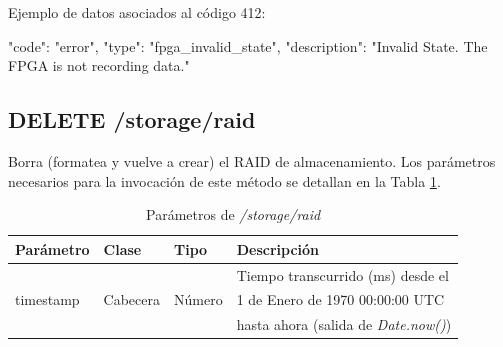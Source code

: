 \begin{itemize}
{\begin{minipage}{\textwidth}
Ejemplo de datos asociados al código 412:

\begin{code}[language=json]
{
  "code": "error",
  "type": "fpga_invalid_state",
  "description": "Invalid State. The FPGA is not recording data."
}
\end{code}
\end{minipage}
}

\end{itemize}

%
%
\subsection{DELETE /storage/raid}
Borra (formatea y vuelve a crear) el \gls{RAID} de almacenamiento. Los parámetros necesarios para la invocación de este método se detallan en la Tabla \ref{extra:api:storageraid:invocacion}.

\begin{table}[H]
\centering
\begin{tabular}{|l|l|l|l|}
\hline
\rowcolor[HTML]{F5F5F5}
\textbf{Parámetro}  & \textbf{Clase} & \textbf{Tipo}   & \textbf{Descripción}                         \\ \hline
                    &                &                 & Tiempo transcurrido (ms) desde el            \\
timestamp           & Cabecera       & Número          & 1 de Enero de 1970 00:00:00 UTC              \\
                    &                &                 & hasta ahora (salida de \textit{Date.now()})  \\ \hline
\end{tabular}
\caption{Parámetros de \textit{/storage/raid}}
\label{extra:api:storageraid:invocacion}
\end{table}

